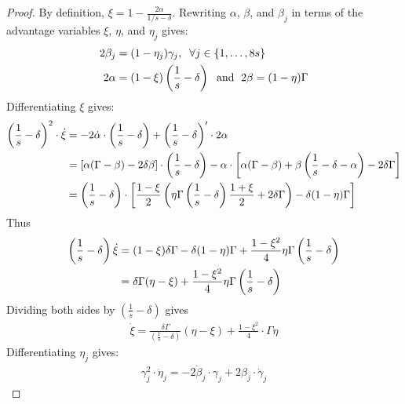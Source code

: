 \documentclass[a4paper,12pt]{article}
\begin{document}
\begin{proof}
By definition, ${\xi} = 1 - \frac{2\alpha}{1/s - \delta}$. Rewriting $\alpha$, $\beta$, and $\beta_j$ in terms of the advantage variables $\xi$, $\eta$, and $\eta_j$ gives:
\begin{align}
2 \beta_j & = (1 - \eta_j) \gamma_j , \; \; \forall j \in \{1, \ldots, 8s\}  \notag \\
2 \alpha & = (1 - \xi) \left(\frac{1}{s} - \delta\right) \; \mbox{ and } \;
2 \beta = (1 - \eta) \Gamma
\end{align}
Differentiating $\xi$ gives:
\begin{align}
\left(\frac{1}{s} - \delta\right)^2 \cdot \dot{\xi} & = - 2 \dot{\alpha} \cdot \left(\frac{1}{s} - \delta\right) + \left(\frac{1}{s} - \delta\right)' \cdot 2 \alpha \notag \\
& = \left[ \alpha(\Gamma - \beta) - 2 \delta \beta \right] \cdot \left(\frac{1}{s} - \delta\right) - \alpha \cdot \left[ \alpha(\Gamma - \beta) + \beta \left(\frac{1}{s} - \delta - \alpha\right) - 2 \delta \Gamma \right] \notag \\
& = \left(\frac{1}{s} - \delta\right) \cdot \left[ \frac{1 - \xi}{2} \left( \eta \Gamma \left(\frac{1}{s} - \delta\right) \frac{1 + \xi}{2} + 2 \delta \Gamma \right) - \delta(1 - \eta) \Gamma \right]
\end{align}
Thus
\begin{align}
\left(\frac{1}{s} - \delta\right) \dot{\xi} & = (1 - \xi) \delta \Gamma - \delta(1 - \eta) \Gamma + \frac{1 - \xi^2}{4} \eta \Gamma \left(\frac{1}{s} - \delta\right) \notag \\
& = \delta \Gamma ( \eta - \xi) + \frac{1 - \xi^2}{4} \eta \Gamma  \left(\frac{1}{s} - \delta\right)
\end{align}
Dividing both sides by $\left(\frac{1}{s} - \delta\right)$ gives
\begin{align} \label{xi_dot_final}
\dot{\xi} = \frac{\delta \Gamma}{\left(\frac{1}{s} - \delta\right)} (\eta - \xi) + \frac{1 - \xi^2}{4} \cdot \Gamma \eta
\end{align}
Differentiating $\eta_j$ gives:
\begin{align} \label{eta_j_dot_def_direct}
\gamma_j^2 \cdot \dot{\eta}_j = - 2 \dot{\beta}_j \cdot \gamma_j + 2 \beta_j \cdot \dot{\gamma}_j
\end{align}

\end{proof}
\end{document}
